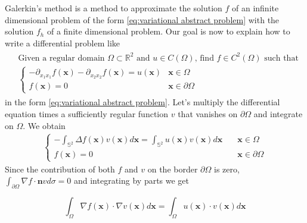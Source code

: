 Galerkin's method is a method to approximate the solution $f$ of an infinite dimensional problem of the form \ref{eq:variational abstract problem} with the solution $f_h$ of a finite dimensional problem. Our goal is now to explain how to write a differential problem like 
\begin{align}\label{eq:strong form}
\begin{split}
&\text{Given a regular domain }\Omega\subset\mathbb R^2\text{ and } u\in C(\Omega)\text{, find }f\in C^2(\Omega) \text{ such that}\\
&\begin{cases}
-\partial_{x_1x_1}f(\mathbf x) - \partial_{x_2x_2}f(\mathbf x) = u(\mathbf x) & \mathbf x \in \Omega\\
f(\mathbf x) =  0& \mathbf x \in \partial \Omega
\end{cases}
\end{split}
\end{align}
in the form \ref{eq:variational abstract problem}. Let's multiply the differential equation times a sufficiently regular function $v$ that vanishes on $\partial \Omega$ and integrate on $\Omega$. We obtain
\begin{align}
\begin{cases}
-\int_{\mathbb S^2}\Delta f(\mathbf x)v(\mathbf x)d\mathbf x =\int_{\mathbb S^2} u(\mathbf x)v(\mathbf x)d\mathbf x &\quad \mathbf x \in \Omega\\
f(\mathbf x) =  0&\quad \mathbf x \in \partial \Omega
\end{cases}	
\end{align}
 Since the contribution of both $f$ and $v$ on the border $\partial \Omega$ is zero, $\int_{\partial \Omega}\nabla f \cdot \mathbf nv d\sigma=0$ and integrating by parts we get

\begin{equation}\label{eq:int by parts}
	\int_\Omega \nabla f(\mathbf x)\cdot\nabla v(\mathbf x) d\mathbf x = \int_\Omega  u(\mathbf x)\cdot v(\mathbf x)d\mathbf x
\end{equation}

